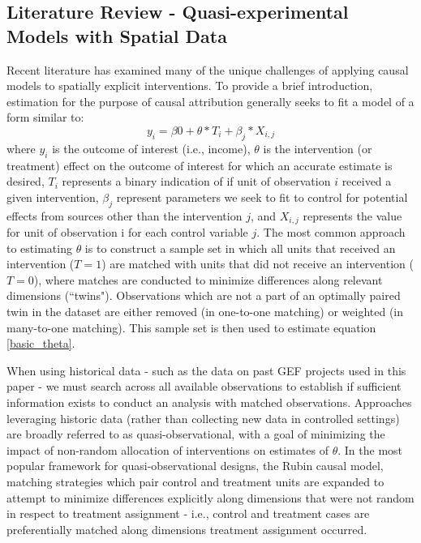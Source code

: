\documentclass[sustainability,article,submit,moreauthors,pdftex]{Definitions/mdpi}
\begin{document}
\subsection{Literature Review - Quasi-experimental Models with Spatial Data}\label{sub:qm}
Recent literature has examined many of the unique challenges of applying causal models to spatially explicit interventions. To provide a brief introduction, estimation for the purpose of causal attribution generally seeks to fit a model of a form similar to:
\begin{equation}\label{basic_theta}
y_{i} = \beta0 + \theta * T_{i} + \beta_{j} * X_{i,j} 
\end{equation} 
where $y_{i}$ is the outcome of interest (i.e., income), $\theta$ is the intervention (or treatment) effect on the outcome of interest for which an accurate estimate is desired, $T_{i}$ represents a binary indication of if unit of observation $i$ received a given intervention, $\beta_{j}$ represent parameters we seek to fit to control for potential effects from sources other than the intervention $j$, and $X_{i,j}$ represents the value for unit of observation i for each control variable $j$.  The most common approach to estimating $\theta$ is to construct a sample set in which all units that received an intervention ($T=1$) are matched with units that did not receive an intervention ($T=0$), where matches are conducted to minimize differences along relevant dimensions (``twins").  Observations which are not a part of an optimally paired twin in the dataset are either removed (in one-to-one matching) or weighted (in many-to-one matching).  This sample set is then used to estimate equation \eqref{basic_theta}. 
\par
When using historical data - such as the data on past GEF projects used in this paper - we must search across all available observations to establish if sufficient information exists to conduct an analysis with matched observations.  Approaches leveraging historic data (rather than collecting new data in controlled settings) are broadly referred to as quasi-observational, with a goal of minimizing the impact of non-random allocation of interventions on estimates of $\theta$.  In the most popular framework for quasi-observational designs, the Rubin causal model, matching strategies which pair control and treatment units are expanded to attempt to minimize differences explicitly along dimensions that were not random in respect to treatment assignment - i.e., control and treatment cases are preferentially matched along dimensions treatment assignment occurred.  
\end{document}
